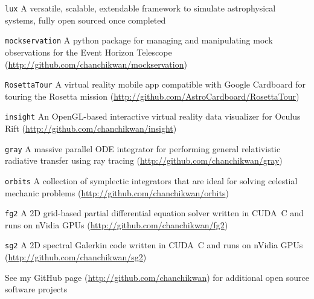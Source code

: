 \begin{Tlist}

\item[\texttt{lux}] A versatile, scalable, extendable framework to
  simulate astrophysical systems, fully open sourced once completed

\item[\texttt{mockservation}] A python package for managing and
  manipulating mock observations for the Event Horizon Telescope
  (\url{http://github.com/chanchikwan/mockservation})

\item[\texttt{RosettaTour}] A virtual reality mobile app compatible
  with Google Cardboard for touring the Rosetta mission
  (\url{http://github.com/AstroCardboard/RosettaTour})

\item[\texttt{insight}] An OpenGL-based interactive virtual reality
  data visualizer for Oculus Rift
  (\url{http://github.com/chanchikwan/insight})

\item[\texttt{gray}] A massive parallel ODE integrator for performing
  general relativistic radiative transfer using ray tracing
  (\url{http://github.com/chanchikwan/gray})

\item[\texttt{orbits}] A collection of symplectic integrators that are
  ideal for solving celestial mechanic problems
  (\url{http://github.com/chanchikwan/orbits})

\item[\texttt{fg2}] A 2D grid-based partial differential equation
  solver written in CUDA~C and runs on nVidia GPUs
  (\url{http://github.com/chanchikwan/fg2})

\item[\texttt{sg2}] A 2D spectral Galerkin code written in CUDA~C and
  runs on nVidia GPUs (\url{http://github.com/chanchikwan/sg2})

\end{Tlist}

\noindent See my GitHub page (\url{http://github.com/chanchikwan}) for
additional open source software projects
